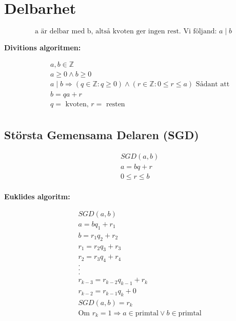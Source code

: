 \newpage

\section{Delbarhet}
\begin{equation}
  \text{a är delbar med b, altså kvoten ger ingen rest. Vi följand: } a \mid b
\end{equation}


\textbf{Divitions algoritmen:}\par
\begin{align*}
  &\quad a, b \in \mathbb{Z}  \\
  &\quad a  \geq 0 \land b  \geq  0 \\
  &\quad a \mid b \Rightarrow (q \in \mathbb{Z} : q \geq 0) \land (r \in \mathbb{Z} : 0 \leq r \leq a) \text{ Sådant att} \\
  &\quad b = q a + r\\
  &\quad q = \text{ kvoten, } r = \text{ resten} \\
\end{align*}



\subsection{Största Gemensama Delaren (SGD)}
\begin{align*}
  &\quad SGD(a,b) \\
  &\quad a = bq + r \\
  &\quad 0 \leq r \leq b \\
\end{align*}

\textbf{Euklides algoritm:}\par
\begin{align*}
  &\quad SGD(a,b) \\
  &\quad a = bq_1 + r_1 \\
  &\quad b = r_1q_2 + r_2 \\
  &\quad r_1 = r_2q_3 + r_3 \\
  &\quad r_2 = r_3q_4 + r_4 \\
  &\quad . \\
  &\quad . \\
  &\quad . \\
  &\quad r_{k-3} = r_{k-2}q_{k-1} + r_{k} \\
  &\quad r_{k-2} = r_{k-1}q_k + 0 \\
  &\quad SGD(a,b) = r_{k} \\
  &\quad \text{Om } r_{k} = 1 \Rightarrow a \in \text{primtal} \lor b \in \text{primtal} \\
\end{align*}

